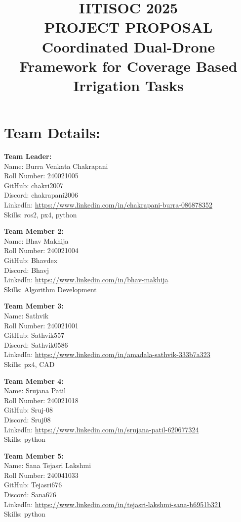 \documentclass[12pt]{article}
\title{IITISOC 2025 \\
PROJECT PROPOSAL \\
Coordinated Dual-Drone Framework for Coverage Based Irrigation Tasks}
\date{}
\begin{document}
\maketitle
\section*{Team Details:}

\textbf{Team Leader:} \\
Name: Burra Venkata Chakrapani \\
Roll Number: 240021005 \\
GitHub: chakri2007 \\
Discord: chakrapani2006 \\
LinkedIn: \url{https://www.linkedin.com/in/chakrapani-burra-086878352} \\
Skills: ros2, px4, python

\vspace{1em}
\textbf{Team Member 2:} \\
Name: Bhav Makhija \\
Roll Number: 240021004 \\
GitHub: Bhavdex \\
Discord: Bhavj \\
LinkedIn: \url{https://www.linkedin.com/in/bhav-makhija} \\
Skills: Algorithm Development

\vspace{1em}
\textbf{Team Member 3:} \\
Name: Sathvik \\
Roll Number: 240021001 \\
GitHub: Sathvik557 \\
Discord: Sathvik0586 \\
LinkedIn: \url{https://www.linkedin.com/in/amadala-sathvik-333b7a323} \\
Skills: px4, CAD

\vspace{1em}
\textbf{Team Member 4:} \\
Name: Srujana Patil \\
Roll Number: 240021018 \\
GitHub: Sruj-08 \\
Discord: Sruj08 \\
LinkedIn: \url{https://www.linkedin.com/in/srujana-patil-620677324} \\
Skills: python

\vspace{1em}
\textbf{Team Member 5:} \\
Name: Sana Tejasri Lakshmi \\
Roll Number: 240041033 \\
GitHub: Tejasri676 \\
Discord: Sana676 \\
LinkedIn: \url{https://www.linkedin.com/in/tejasri-lakshmi-sana-b6951b321} \\
Skills: python
\end{document}
